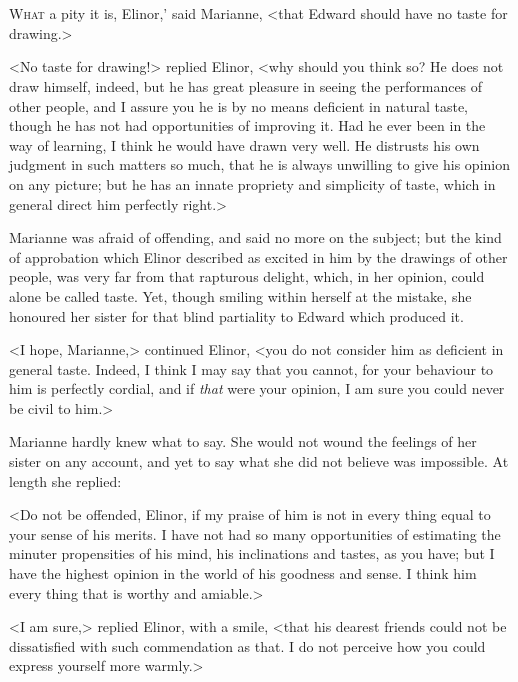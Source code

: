 \chapter[Chapter \thechapter]{}
	\lettrine[ante=`,lraise=0.3]{W}{hat} a pity it is, Elinor,' said Marianne, <that Edward should have no taste for drawing.>

\zz
<No taste for drawing!> replied Elinor, <why should you think so? He does not draw himself, indeed, but he has great pleasure in seeing the performances of other people, and I assure you he is by no means deficient in natural taste, though he has not had opportunities of improving it. Had he ever been in the way of learning, I think he would have drawn very well. He distrusts his own judgment in such matters so much, that he is always unwilling to give his opinion on any picture; but he has an innate propriety and simplicity of taste, which in general direct him perfectly right.>

Marianne was afraid of offending, and said no more on the subject; but the kind of approbation which Elinor described as excited in him by the drawings of other people, was very far from that rapturous delight, which, in her opinion, could alone be called taste. Yet, though smiling within herself at the mistake, she honoured her sister for that blind partiality to Edward which produced it.

<I hope, Marianne,> continued Elinor, <you do not consider him as deficient in general taste. Indeed, I think I may say that you cannot, for your behaviour to him is perfectly cordial, and if \textit{that} were your opinion, I am sure you could never be civil to him.>

Marianne hardly knew what to say. She would not wound the feelings of her sister on any account, and yet to say what she did not believe was impossible. At length she replied:

<Do not be offended, Elinor, if my praise of him is not in every thing equal to your sense of his merits. I have not had so many opportunities of estimating the minuter propensities of his mind, his inclinations and tastes, as you have; but I have the highest opinion in the world of his goodness and sense. I think him every thing that is worthy and amiable.>

<I am sure,> replied Elinor, with a smile, <that his dearest friends could not be dissatisfied with such commendation as that. I do not perceive how you could express yourself more warmly.>

